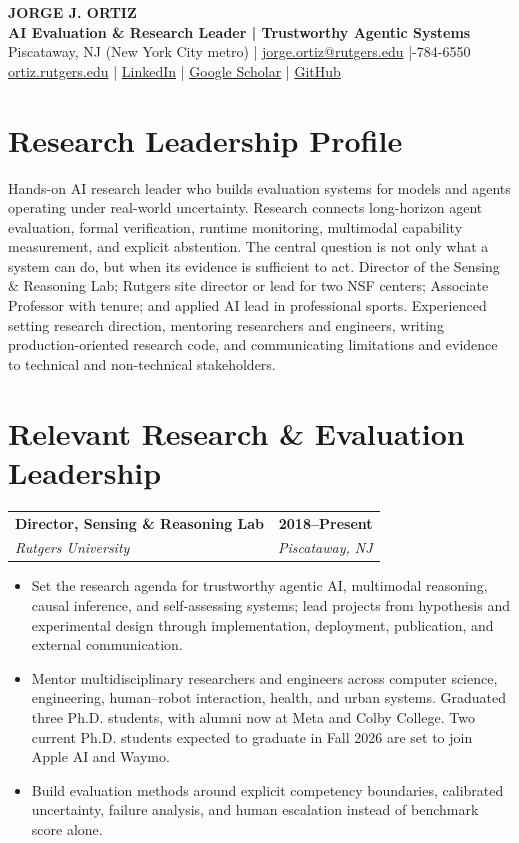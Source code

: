 \documentclass[10pt,letterpaper]{article}
\makeatletter
\newcommand{\role}[4]{%
  \par\noindent
  \begin{tabularx}{\textwidth}{@{}Xr@{}}
    \textbf{\color{ink}#1} & \textbf{\color{muted}#2}\\
    \textit{\color{muted}#3} & \textit{\color{muted}#4}
  \end{tabularx}\par
}
\makeatother
\begin{document}
\begin{center}
  {\fontsize{24}{27}\selectfont\bfseries\color{ink} JORGE J. ORTIZ}\\[2pt]
  {\large\bfseries\color{accent} AI Evaluation \& Research Leader | Trustworthy Agentic Systems}\\[4pt]
  \small
  Piscataway, NJ (New York City metro) \enspace|\enspace
  \href{mailto:jorge.ortiz@rutgers.edu}{jorge.ortiz@rutgers.edu} \enspace|-784-6550\\[-1pt]
  \href{https://ortiz.rutgers.edu}{ortiz.rutgers.edu} \enspace|\enspace
  \href{https://www.linkedin.com/in/jorgeortizphd/}{LinkedIn} \enspace|\enspace
  \href{https://scholar.google.com/citations?user=AcyG538AAAAJ&hl=en}{Google Scholar} \enspace|\enspace
  \href{https://github.com/jortizcs}{GitHub}
\end{center}

\vspace{-3pt}
\section{Research Leadership Profile}
\small
\justifying
Hands-on AI research leader who builds evaluation systems for models and agents operating under real-world uncertainty. Research connects long-horizon agent evaluation, formal verification, runtime monitoring, multimodal capability measurement, and explicit abstention. The central question is not only what a system can do, but when its evidence is sufficient to act. Director of the Sensing \& Reasoning Lab; Rutgers site director or lead for two NSF centers; Associate Professor with tenure; and applied AI lead in professional sports. Experienced setting research direction, mentoring researchers and engineers, writing production-oriented research code, and communicating limitations and evidence to technical and non-technical stakeholders.

\section{Relevant Research \& Evaluation Leadership}

\role{Director, Sensing \& Reasoning Lab}{2018--Present}
{Rutgers University}{Piscataway, NJ}
\begin{itemize}
  \item Set the research agenda for trustworthy agentic AI, multimodal reasoning, causal inference, and self-assessing systems; lead projects from hypothesis and experimental design through implementation, deployment, publication, and external communication.
  \item Mentor multidisciplinary researchers and engineers across computer science, engineering, human--robot interaction, health, and urban systems. Graduated three Ph.D. students, with alumni now at Meta and Colby College. Two current Ph.D. students expected to graduate in Fall 2026 are set to join Apple AI and Waymo.
  \item Build evaluation methods around explicit competency boundaries, calibrated uncertainty, failure analysis, and human escalation instead of benchmark score alone.
\end{itemize}
\end{document}
